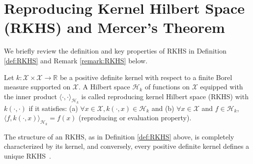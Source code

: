 \documentclass[final,12pt]{colt2026} %
\begin{document}






\appendix


\section{Reproducing Kernel Hilbert Space (RKHS) and Mercer's Theorem}\label{app:RKHS-Mercer}

We briefly review the definition and key properties of RKHS in Definition \ref{def:RKHS} and Remark \ref{remark:RKHS} below.

\begin{definition}\label{def:RKHS}
Let $k:\mathcal X \times \mathcal X \to \mathbb{R}$ be a positive definite kernel with respect to a finite Borel measure supported on $\mathcal X$. A Hilbert space $\mathcal H_{k}$ of functions on $\mathcal X$ equipped with the inner product $\langle \cdot, \cdot \rangle_{\mathcal H_k}$ is called reproducing kernel Hilbert space (RKHS) with $k(\cdot, \cdot)$ if it satisfies: (a) $\forall x\in \mathcal X, k(\cdot, x)\in \mathcal H_k$ and (b) $\forall x\in \mathcal X$ and $f\in \mathcal H_k$, $\langle f, k(\cdot, x)\rangle_{\mathcal H_k} = f(x)$ (reproducing or evaluation property).
\end{definition}

\begin{remark}\label{remark:RKHS}
The structure of an RKHS, as in Definition \ref{def:RKHS} above, is completely characterized by its kernel, and conversely, every positive definite kernel defines a unique RKHS~\citep{aronszajn1950theory}.
\end{remark}
\end{document}

